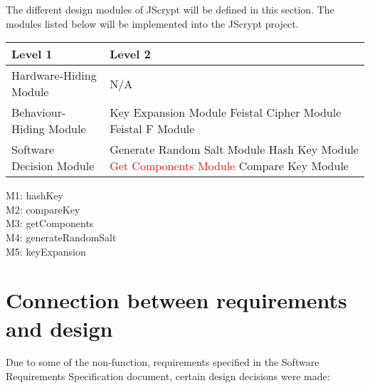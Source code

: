 \documentclass[12pt]{article}
\begin{document}
The different design modules of JScrypt will be defined in this section. The modules listed below will be implemented into the JScrypt project.
\begin{table}[H]
  \begin{tabular}{ | p{6cm} | p{7cm}|}
    \hline
        \textbf{Level 1} & \textbf{Level 2}\\
    \hline

      Hardware-Hiding Module & N/A \\
   \hline

    Behaviour-Hiding Module & Key Expansion Module \newline Feistal Cipher Module \newline Feistal F Module  \\
   \hline

    Software Decision Module & Generate Random Salt Module \newline Hash Key Module \newline \textcolor{red}{Get Components Module} \newline Compare Key Module \\
   \hline

 \end{tabular}
\end{table}

\noindent M1: hashKey \\
M2: compareKey \\
M3: getComponents \\
M4: generateRandomSalt \\
M5: keyExpansion \\




\section{Connection between requirements and design}

  Due to some of the non-function, requirements specified in the Software Requirements Specification document, certain design decisions were made:
\end{document}
